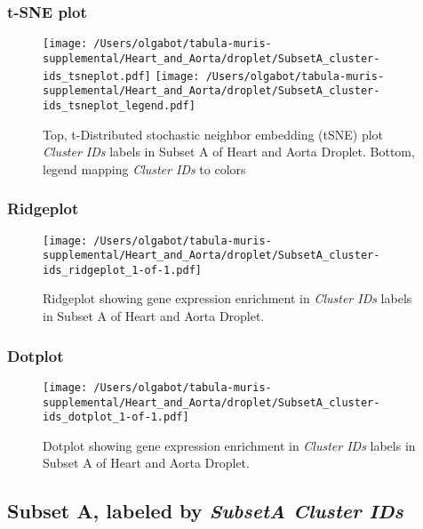 \clearpage
\subsubsection{t-SNE plot}
\begin{figure}[h]
\centering
\texttt{[image: /Users/olgabot/tabula-muris-supplemental/Heart\_and\_Aorta/droplet/SubsetA\_cluster-ids\_tsneplot.pdf]}
\texttt{[image: /Users/olgabot/tabula-muris-supplemental/Heart\_and\_Aorta/droplet/SubsetA\_cluster-ids\_tsneplot\_legend.pdf]}
\caption{Top, t-Distributed stochastic neighbor embedding (tSNE) plot  \emph{Cluster IDs} labels in Subset A of Heart and Aorta Droplet. Bottom, legend mapping \emph{Cluster IDs} to colors}
\end{figure}


\clearpage

\subsubsection{Ridgeplot}
\begin{figure}[h]
\centering
\texttt{[image: /Users/olgabot/tabula-muris-supplemental/Heart\_and\_Aorta/droplet/SubsetA\_cluster-ids\_ridgeplot\_1-of-1.pdf]}

\caption{ Ridgeplot  showing gene expression enrichment in \emph{Cluster IDs} labels in Subset A of Heart and Aorta Droplet. }
\end{figure}


\clearpage

\subsubsection{Dotplot}
\begin{figure}[h]
\centering
\texttt{[image: /Users/olgabot/tabula-muris-supplemental/Heart\_and\_Aorta/droplet/SubsetA\_cluster-ids\_dotplot\_1-of-1.pdf]}

\caption{ Dotplot  showing gene expression enrichment in \emph{Cluster IDs} labels in Subset A of Heart and Aorta Droplet. }
\end{figure}


\clearpage

\subsection{Subset A, labeled by \emph{SubsetA Cluster IDs}}
